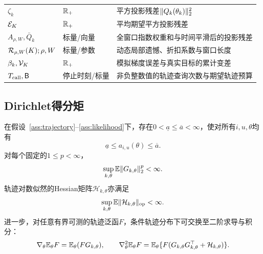 \begin{table}[H]
\begin{tabularx}{\textwidth}{@{}p{}p{}X@{}}
$\zeta_k$ & $\mathbb R_+$ & 平方投影残差$\lVert Q_k(\theta_k)\rVert_2^2$ \\
$\mathcal E_K$ & $\mathbb R_+$ & 平均期望平方投影残差 \\
$A_{\rho,W},\bar Q_k$ & 标量/向量 & 全窗口指数权重和与时间平滑后的投影残差 \\
$\mathcal R_{\rho,W}(K);\rho,W$ & 标量/参数 & 动态局部遗憾、折扣系数与窗口长度 \\
$\beta_k,\mathcal V_K$ & $\mathbb R_+$ & 模拟梯度误差与真实目标的累计变差 \\
$T_{\rm call},\mathsf B$ & 停止时刻/标量 & 非负整数值的轨迹查询次数与期望轨迹预算 \\
\bottomrule
\end{tabularx}
\end{table}

\subsection{Dirichlet得分矩}

\begin{lemma}[增广轨迹得分的统一矩界]\label{lem:dirichlet-moments}
在假设~\ref{ass:trajectory}--\ref{ass:likelihood}下，存在$0<\underline a\le\overline a<\infty$，使对所有$i,u,\theta$均有
\begin{equation}\label{eq:concentration-compactness}
 \underline a\le a_{i,u}(\theta)\le\overline a.
\end{equation}
对每个固定的$1\le p<\infty$，
\begin{equation}\label{eq:score-moment-bound}
 \sup_{k,\theta}\mathbb E\lVert G_{k,\theta}\rVert_2^p<\infty.
\end{equation}
轨迹对数似然的Hessian矩阵$\mathcal H_{k,\theta}$亦满足
\begin{equation}\label{eq:hessian-moment-bound}
 \sup_{k,\theta}\mathbb E\lVert\mathcal H_{k,\theta}\rVert_{\mathrm{op}}<\infty.
\end{equation}
进一步，对任意有界可测的轨迹泛函$F$，条件轨迹分布下可交换至二阶求导与积分：
\begin{equation}\label{eq:likelihood-ratio-identities}
 \nabla_\theta\mathbb E_\theta F=\mathbb E_\theta(FG_{k,\theta}),
 \qquad
 \nabla_\theta^2\mathbb E_\theta F
 =\mathbb E_\theta\{F(G_{k,\theta}G_{k,\theta}^\top+\mathcal H_{k,\theta})\}.
\end{equation}
\end{lemma}

